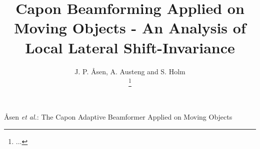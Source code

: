 \documentclass[journal]{IEEEtran}
\begin{document}
%
\title{Capon Beamforming Applied on Moving Objects - An Analysis of Local Lateral Shift-Invariance}
%
%
%

\author{
   J. P. \AA{}sen, A. Austeng and S. Holm%
   
   \thanks{...}
}

% 
%



%
{\AA{}sen \MakeLowercase{\textit{et al.}}: The Capon Adaptive Beamformer Applied on Moving Objects }
% 
\end{document}
